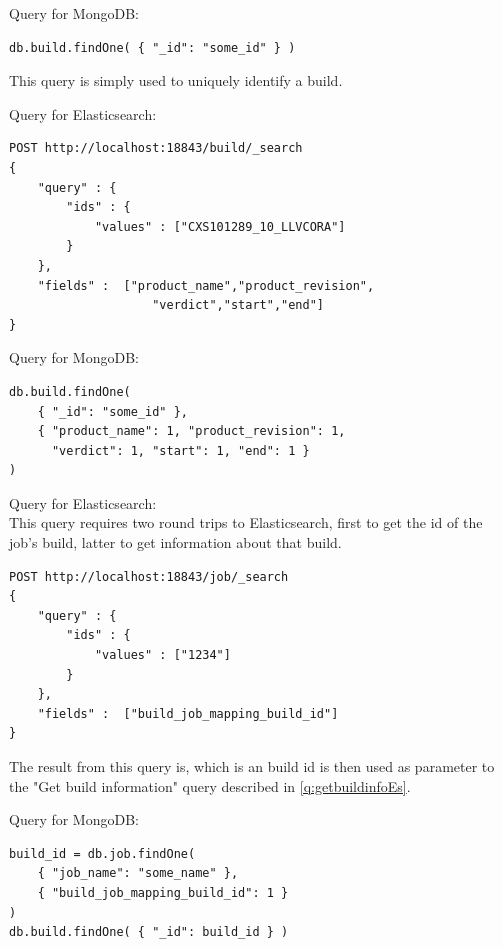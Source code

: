 Query for MongoDB:
\begin{verbatim}
db.build.findOne( { "_id": "some_id" } )
\end{verbatim}
This query is simply used to uniquely identify a build.


\label{q:getbuildEs}
Query for Elasticsearch:
\begin{verbatim}
POST http://localhost:18843/build/_search
{ 
    "query" : {
        "ids" : { 
            "values" : ["CXS101289_10_LLVCORA"]
        }
    },
    "fields" :  ["product_name","product_revision",
                    "verdict","start","end"]
}
\end{verbatim}

Query for MongoDB:
\begin{verbatim}
db.build.findOne( 
    { "_id": "some_id" }, 
    { "product_name": 1, "product_revision": 1, 
      "verdict": 1, "start": 1, "end": 1 } 
)
\end{verbatim}

Query for Elasticsearch:\\
This query requires two round trips to Elasticsearch, first to get the id of the job's build, latter to get information about that build.\\
\begin{verbatim}
POST http://localhost:18843/job/_search
{ 
    "query" : {
        "ids" : { 
            "values" : ["1234"]
        }
    },
    "fields" :  ["build_job_mapping_build_id"]
}
\end{verbatim}
The result from this query is, which is an build id is then used as parameter to the "Get build information" query described in \ref{q:getbuildinfoEs}. 


Query for MongoDB:
\begin{verbatim}
build_id = db.job.findOne( 
    { "job_name": "some_name" }, 
    { "build_job_mapping_build_id": 1 } 
)
db.build.findOne( { "_id": build_id } )
\end{verbatim}







